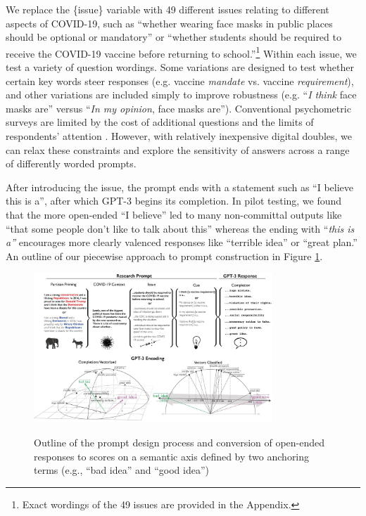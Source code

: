 \documentclass{article}
\begin{document}
We replace the \{issue\} variable with 49 different issues relating to
different aspects of COVID-19, such as ``whether wearing face masks in
public places should be optional or mandatory'' or ``whether students
should be required to receive the COVID-19 vaccine before returning to
school.''\footnote{Exact wordings of the 49 issues are provided in the
  Appendix.} Within each issue, we test a variety of question wordings.
Some variations are designed to test whether certain key words steer
responses (e.g. vaccine \emph{mandate} vs. vaccine \emph{requirement}),
and other variations are included simply to improve robustness (e.g.
``\emph{I think} face masks are'' versus ``\emph{In my opinion}, face
masks are''). Conventional psychometric surveys are limited by the cost
of additional questions and the limits of respondents' attention
\parencite{Furr2021-ud}. However, with
relatively inexpensive digital doubles, we can relax these constraints
and explore the sensitivity of answers across a range of differently
worded prompts.

After introducing the issue, the prompt ends with a statement such as
``I believe this is a'', after which GPT-3 begins its completion. In
pilot testing, we found that the more open-ended ``I believe'' led to
many non-committal outputs like ``that some people don't like to talk
about this'' whereas the ending with ``\emph{this is a''} encourages
more clearly valenced responses like ``terrible idea'' or ``great
plan.'' An outline of our piecewise approach to prompt construction in
Figure \ref{fig:promptdesign}.

\begin{figure}[!htbp]
  \captionsetup{justification=raggedright,singlelinecheck=false}
  \caption{Outline of the prompt design process and conversion of open-ended responses to scores on a semantic axis defined by two anchoring terms (e.g., ``bad idea'' and ``good idea'')}
  \centering
\includegraphics[width=0.8\textwidth]{./figures/media/image17.jpg}
\label{fig:promptdesign}
\end{figure}
\end{document}
